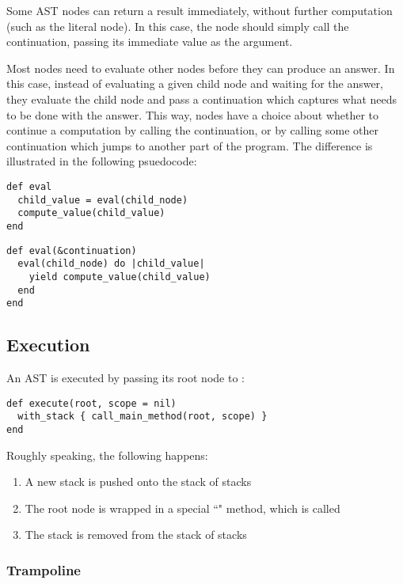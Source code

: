Some AST nodes can return a result immediately, without further computation (such as the literal  node). In this case, the node should simply call the continuation, passing its immediate value as the argument.

Most nodes need to evaluate other nodes before they can produce an answer. In this case, instead of evaluating a given child node and waiting for the answer, they evaluate the child node and pass a continuation which captures what needs to be done with the answer. This way, nodes have a choice about whether to continue a computation by calling the continuation, or by calling some other continuation which jumps to another part of the program. The difference is illustrated in the following psuedocode:

\begin{lstlisting}[title={\textbf{Without CPS}}]
def eval
  child_value = eval(child_node)
  compute_value(child_value)
end
\end{lstlisting}

\begin{lstlisting}[title={\textbf{With CPS}}]
def eval(&continuation)
  eval(child_node) do |child_value|
    yield compute_value(child_value)
  end
end
\end{lstlisting}

\subsection{Execution}

An AST is executed by passing its root node to :

\begin{lstlisting}
def execute(root, scope = nil)
  with_stack { call_main_method(root, scope) }
end
\end{lstlisting}

Roughly speaking, the following happens:

\begin{enumerate}
  \item A new stack is pushed onto the stack of stacks
  \item The root node is wrapped in a special ``" method, which is called
  \item The stack is removed from the stack of stacks
\end{enumerate}

\subsubsection{Trampoline}

